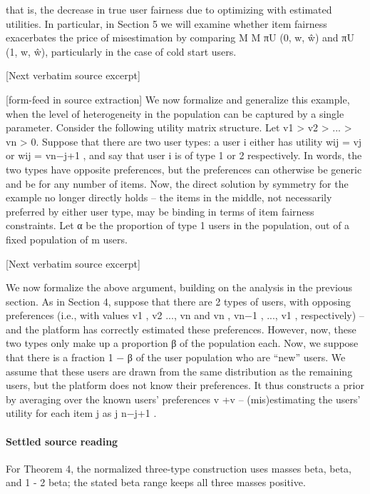 \documentclass[10pt]{article}
\begin{document}
\begin{ReviewVerbatim}
that is, the decrease in true user fairness due to optimizing with estimated utilities. In particular, in
Section 5 we will examine whether item fairness exacerbates the price of misestimation by comparing
M
M
πU
(0, w, ŵ) and πU
(1, w, ŵ), particularly in the case of cold start users.

[Next verbatim source excerpt]


[form-feed in source extraction]
We now formalize and generalize this example, when the level of heterogeneity in the population
can be captured by a single parameter. Consider the following utility matrix structure. Let v1 >
v2 > ... > vn > 0. Suppose that there are two user types: a user i either has utility wij = vj or
wij = vn−j+1 , and say that user i is of type 1 or 2 respectively. In words, the two types have opposite
preferences, but the preferences can otherwise be generic and be for any number of items. Now, the
direct solution by symmetry for the example no longer directly holds – the items in the middle, not
necessarily preferred by either user type, may be binding in terms of item fairness constraints.
Let α be the proportion of type 1 users in the population, out of a fixed population of m users.

[Next verbatim source excerpt]

We now formalize the above argument, building on the analysis in the previous section. As in
Section 4, suppose that there are 2 types of users, with opposing preferences (i.e., with values
v1 , v2 ..., vn and vn , vn−1 , ..., v1 , respectively) – and the platform has correctly estimated these
preferences. However, now, these two types only make up a proportion β of the population each.
Now, we suppose that there is a fraction 1 − β of the user population who are “new” users. We assume
that these users are drawn from the same distribution as the remaining users, but the platform does
not know their preferences. It thus constructs a prior by averaging over the known users’ preferences
v +v
– (mis)estimating the users’ utility for each item j as j n−j+1
.
\end{ReviewVerbatim}

\paragraph{Settled source reading}
For Theorem 4, the normalized three-\allowbreak{}type construction uses masses beta, beta, and 1 -\allowbreak{} 2 beta;\allowbreak{} the stated beta range keeps all three masses positive.\allowbreak{}
\end{document}
